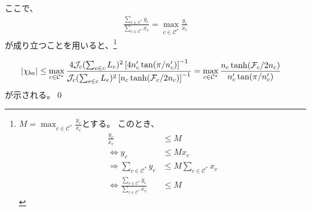 \documentclass[a4paper,11pt]{jsarticle}
\numberwithin{equation}{section}
\begin{document}
ここで、
\begin{align}
\frac{
\sum_{c \in \mathcal{C}^*} y_c
}{
\sum_{c \in \mathcal{C}^*} x_c
}
=
\max_{c \in \mathcal{C}^*} \frac{y_c}{x_c}
\end{align}
が成り立つことを用いると、\footnote{
    $M = \max_{c \in \mathcal{C}^*} \frac{y_c}{x_c}$とする。
    このとき、
    \begin{align}
        \frac{y_c}{x_c} &\leq M \\
        \Leftrightarrow y_c &\leq M x_c\\
        \Rightarrow \sum_{c \in \mathcal{C}^*} y_c &\leq M \sum_{c \in \mathcal{C}^*} x_c \\
        \Leftrightarrow \frac{\sum_{c \in \mathcal{C}^*} y_c}{\sum_{c \in \mathcal{C}^*} x_c} &\leq M
    \end{align}
}

\begin{align}
\abs{\chi_{ba}}
&\leq
\max_{c \in \mathcal{C}^*}
\frac{
4 \mathcal{J}_c (\sum_{e \in c} L_e)^2
\left[ 4n'_c \tan(\pi / n'_c) \right]^{-1}
}{
\mathcal{J}_c (\sum_{e \in c} L_e)^2
\left[ n_c \tanh(\mathcal{F}_c / 2n_c) \right]^{-1}
}
=
\max_{c \in \mathcal{C}^*}
\frac{
n_c \tanh(\mathcal{F}_c / 2n_c)
}{
n'_c \tan(\pi / n'_c)
}
\end{align}
が示される。\qed\\
\end{document}
